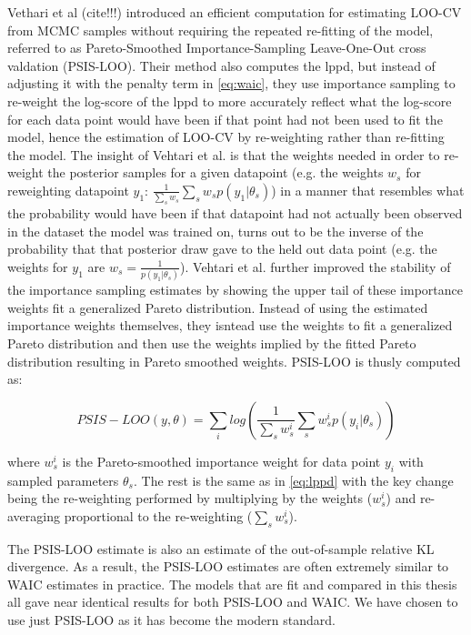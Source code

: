 Vethari et al (cite!!!) introduced an efficient computation for estimating LOO-CV from MCMC samples without requiring the repeated re-fitting of the model, referred to as Pareto-Smoothed Importance-Sampling Leave-One-Out cross valdation (PSIS-LOO). Their method also computes the lppd, but instead of adjusting it with the penalty term in \ref{eq:waic}, they use importance sampling to re-weight the log-score of the lppd to more accurately reflect what the log-score for each data point would have been if that point had not been used to fit the model, hence the estimation of LOO-CV by re-weighting rather than re-fitting the model. The insight of Vehtari et al. is that the weights needed in order to re-weight the posterior samples for a given datapoint (e.g. the weights $w_s$ for reweighting datapoint $y_1$: $\frac{1}{\sum_s w_s} \sum_s w_s p(y_1 | \theta_s)$) in a manner that resembles what the probability would have been if that datapoint had not actually been observed in the dataset the model was trained on, turns out to be the inverse of the probability that that posterior draw gave to the held out data point (e.g. the weights for $y_1$ are $w_s = \frac{1}{p(y_1|\theta_s)}$). Vehtari et al. further improved the stability of the importance sampling estimates by showing the upper tail of these importance weights fit a generalized Pareto distribution. Instead of using the estimated importance weights themselves, they isntead use the weights to fit a generalized Pareto distribution and then use the weights implied by the fitted Pareto distribution resulting in Pareto smoothed weights. PSIS-LOO is thusly computed as:

\begin{equation} \label{eq:psis-loo}
PSIS-LOO(y, \theta) = \sum_i log \left( \frac{1}{\sum_s w_s^i} \sum_s w_s^i p(y_i | \theta_s) \right)
\end{equation}

where $w_s^i$ is the Pareto-smoothed importance weight for data point $y_i$ with sampled parameters $\theta_s$. The rest is the same as in \ref{eq:lppd} with the key change being the re-weighting performed by multiplying by the weights ($w_s^i$) and re-averaging proportional to the re-weighting ($\sum_s w_s^i$).

The PSIS-LOO estimate is also an estimate of the out-of-sample relative KL divergence. As a result, the PSIS-LOO estimates are often extremely similar to WAIC estimates in practice. The models that are fit and compared in this thesis all gave near identical results for both PSIS-LOO and WAIC. We have chosen to use just PSIS-LOO as it has become the modern standard.

